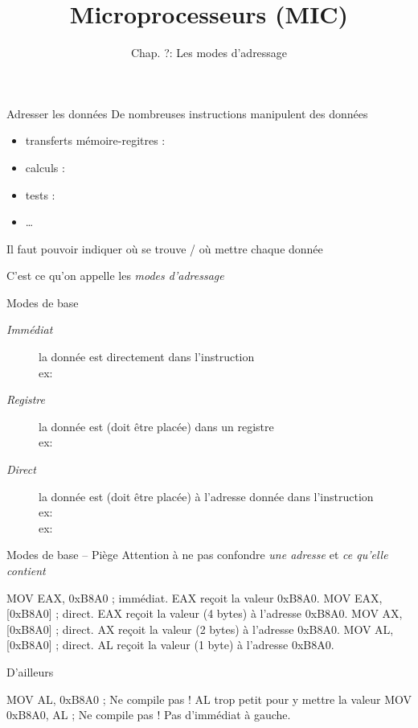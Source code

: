 \documentclass[14pt]{beamer}
\title{Microprocesseurs (MIC)}
\subtitle{Chap. ?: Les modes d'adressage}
\date{}
\begin{document}
\begin{frame}
\titlepage
\end{frame}

\begin{frame}[fragile]{Adresser les données}
De nombreuses instructions manipulent des données
	\begin{itemize}
	\item transferts mémoire-regitres : 
	\item calculs : 
	\item tests : 
	\item \dots
	\end{itemize}

\medskip
Il faut pouvoir indiquer où se trouve / où mettre chaque donnée

\medskip
C'est ce qu'on appelle les \emph{modes d'adressage}
\end{frame}

\begin{frame}[fragile]{Modes de base}
\begin{description}
  \item[\emph{Immédiat}] 
	la donnée est directement dans l'instruction
	\\ex:  
  \item[\emph{Registre}] la donnée est (doit être placée) dans un registre
	\\ex:  \asm{,} 
  \item[\emph{Direct}] la donnée est (doit être placée) à l'adresse donnée dans l'instruction
	\\ex:  \fbox{\asm{[0xB8A0]}}
	\\ex:  \fbox{\asm{[0xB8A2]}}
\end{description}
\end{frame}

\begin{frame}[fragile]{Modes de base -- Piège}
Attention à ne pas confondre \emph{une adresse} et \emph{ce qu'elle contient}
\begin{Asm}
	MOV EAX, 0xB8A0      ; immédiat. EAX reçoit la valeur 0xB8A0.
	MOV EAX, [0xB8A0]    ; direct. EAX reçoit la valeur (4 bytes) à l'adresse 0xB8A0.
	MOV AX, [0xB8A0]     ; direct. AX reçoit la valeur (2 bytes) à l'adresse 0xB8A0.
	MOV AL, [0xB8A0]     ; direct. AL reçoit la valeur (1 byte) à l'adresse 0xB8A0.
\end{Asm}
\bigskip
D'ailleurs
\begin{Asm}
	MOV AL, 0xB8A0      ; Ne compile pas ! AL trop petit pour y mettre la valeur
	MOV 0xB8A0, AL      ; Ne compile pas ! Pas d'immédiat à gauche.
\end{Asm}
\end{frame}
\end{document}
